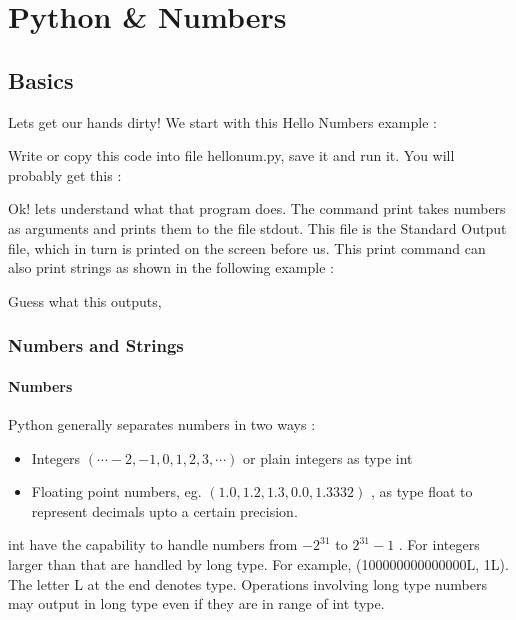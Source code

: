 
\chapter{Python \& Numbers}

\section{Basics}

Lets get our hands dirty! We start with this {\color{magenta} Hello Numbers} example :


Write or copy this code into file {\color{magenta} hellonum.py,}  save it and run it. You will probably get this :


Ok! lets understand what that program does. The command {\color{magenta} print} takes numbers as arguments
 and prints them to the file {\color{magenta} stdout}. This file is the Standard Output file, which in turn is printed
on the screen before us. This print command can also print strings as shown in the following example :


Guess what this outputs,


\subsection{Numbers and Strings}
\subsubsection{Numbers}
Python generally separates numbers in two ways :

\begin{itemize}
\item Integers $(\cdots -2, -1, 0, 1, 2, 3, \cdots)$ or plain integers as type {\color{cyan} int}
\item Floating point numbers, eg. $(1.0, 1.2, 1.3, 0.0, 1.3332)$ , as type {\color{cyan} float} to represent decimals upto a certain precision.
\end{itemize}

{\color{cyan} int} have the capability to handle numbers from $-2^{31}$ to $2^{31}-1$ . For integers larger than that are handled by {\color{cyan} long} type. For example, (100000000000000L, 1L). The letter {\color{cyan} L} at the end denotes type. Operations involving {\color{cyan} long} type numbers may output in {\color{cyan} long} type even if they are in range of {\color{cyan} int} type.

